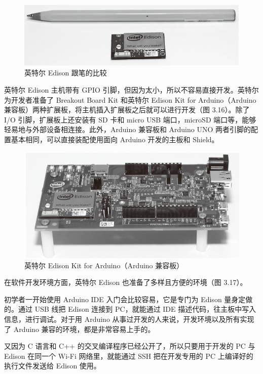\documentclass[12pt,UTF8]{ctexbook}
\begin{document}
\begin{figure}[htbp]
	\centering
	\includegraphics[width=1\linewidth]{66}
	\caption{英特尔 Edison 跟笔的比较}
	\label{fig:1}
\end{figure}

英特尔 Edison 主机带有 GPIO 引脚，但因为太小，所以不容易直接开发。英特尔为开发者准备了 Breakout Board Kit 和英特尔 Edison Kit for Arduino（Arduino 兼容板）两种扩展板，将主机插入扩展板之后就可以进行开发（图 3.16）。除了 I/O 引脚，扩展板上还安装有 SD 卡和 micro USB 端口，microSD 端口等，能够轻易地与外部设备相连接。此外，Arduino 兼容板和 Arduino UNO 两者引脚的配置基本相同，可以直接装配使用面向 Arduino 开发的主板和 Shield。

\begin{figure}[htbp]
	\centering
	\includegraphics[width=1\linewidth]{67}
	\caption{英特尔 Edison Kit for Arduino（Arduino 兼容板）}
	\label{fig:1}
\end{figure}

在软件开发环境方面，英特尔 Edison 也准备了多样且方便的环境（图 3.17）。

初学者一开始使用 Arduino IDE 入门会比较容易，它是专门为 Edison 量身定做的。通过 USB 线把 Edison 连接到 PC，就能通过 IDE 描述代码，往主板中写入信息，进行调试。对于用 Arduino 从事过开发的人来说，开发环境以及所有实现了 Arduino 兼容的环境，都是非常容易上手的。

又因为 C 语言和 C++ 的交叉编译程序已经公开了，所以只要用于开发的 PC 与 Edison 在同一个 Wi-Fi 网络里，就能通过 SSH 把在开发专用的 PC 上编译好的执行文件发送给 Edison 使用。
\end{document}
